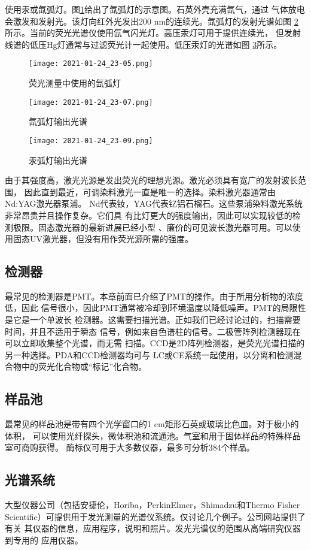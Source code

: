 使用汞或氙弧灯。图\ref{fig:5.55}给出了氙弧灯的示意图。石英外壳充满氙气，通过
气体放电会激发和发射光。该灯向红外光发出200 nm的连续光。氙弧灯的发射光谱如图
\ref{fig:5.56}所示。当前的荧光光谱仪使用氙气闪光灯。高压汞灯可用于提供连续光，
但发射线谱的低压Hg灯通常与过滤荧光计一起使用。低压汞灯的光谱如图
\ref{fig:5.57}所示。
\begin{figure}[htpb]
    \centering
    \texttt{[image: 2021-01-24\_23-05.png]}
    \caption{荧光测量中使用的氙弧灯}
    \label{fig:5.55}
\end{figure}
\begin{figure}[htpb]
    \centering
    \texttt{[image: 2021-01-24\_23-07.png]}
    \caption{氙弧灯输出光谱}
    \label{fig:5.56}
\end{figure}
\begin{figure}[htpb]
    \centering
    \texttt{[image: 2021-01-24\_23-09.png]}
    \caption{汞弧灯输出光谱}
    \label{fig:5.57}
\end{figure}

由于其强度高，激光光源是发出荧光的理想光源。激光必须具有宽广的发射波长范围，
因此直到最近，可调染料激光一直是唯一的选择。染料激光器通常由Nd:YAG激光器泵浦。
Nd代表钕，YAG代表钇铝石榴石。这些泵浦染料激光系统非常昂贵并且操作复杂。它们具
有比灯更大的强度输出，因此可以实现较低的检测极限。固态激光器的最新进展已经小型
、廉价的可见波长激光器可用。可以使用固态UV激光器，但没有用作荧光源所需的强度。
\subsection{检测器}
最常见的检测器是PMT。本章前面已介绍了PMT的操作。由于所用分析物的浓度低，因此
信号很小，因此PMT通常被冷却到环境温度以降低噪声。PMT的局限性是它是一个单波长
检测器。这需要扫描光谱。正如我们已经讨论过的，扫描需要时间，并且不适用于瞬态
信号，例如来自色谱柱的信号。二极管阵列检测器现在可以立即收集整个光谱，而无需
扫描。CCD是2D阵列检测器，是荧光光谱扫描的另一种选择。PDA和CCD检测器均可与
LC或CE系统一起使用，以分离和检测混合物中的荧光化合物或“标记”化合物。
\subsection{样品池}
最常见的样品池是带有四个光学窗口的1 cm矩形石英或玻璃比色皿。对于极小的体积，
可以使用光纤探头，微体积池和流通池。气室和用于固体样品的特殊样品室可商购获得。
酶标仪可用于大多数仪器，最多可分析384个样品。
\subsection{光谱系统}
大型仪器公司（包括安捷伦，Horiba，PerkinElmer，Shimadzu和Thermo Fisher
Scientific）可提供用于发光测量的光谱仪系统。仅讨论几个例子。公司网站提供了有关
其仪器的信息，应用程序，说明和照片。发光光谱仪的范围从高端研究仪器到专用的
应用仪器。

